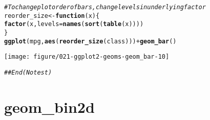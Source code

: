 \documentclass[a4paper,titlepage]{tufte-handout}\usepackage[]{graphicx}\usepackage[]{color}
\makeatletter
\def\maxwidth{ %
  \ifdim\Gin@nat@width>\linewidth
    \linewidth
  \else
    \Gin@nat@width
  \fi
}
\newcommand{\hlcom}[1]{\textcolor[rgb]{0.678,0.584,0.686}{\textit{#1}}}%
\newcommand{\hlopt}[1]{\textcolor[rgb]{0,0,0}{#1}}%
\newcommand{\hlstd}[1]{\textcolor[rgb]{0.345,0.345,0.345}{#1}}%
\newcommand{\hlkwa}[1]{\textcolor[rgb]{0.161,0.373,0.58}{\textbf{#1}}}%
\newcommand{\hlkwb}[1]{\textcolor[rgb]{0.69,0.353,0.396}{#1}}%
\newcommand{\hlkwc}[1]{\textcolor[rgb]{0.333,0.667,0.333}{#1}}%
\newcommand{\hlkwd}[1]{\textcolor[rgb]{0.737,0.353,0.396}{\textbf{#1}}}%
\newenvironment{kframe}{%
 \def\at@end@of@kframe{}%
 \ifinner\ifhmode%
  \def\at@end@of@kframe{\end{minipage}}%
  \begin{minipage}{\columnwidth}%
 \fi\fi%
 \def\FrameCommand##1{\hskip\@totalleftmargin \hskip-\fboxsep
 \colorbox{shadecolor}{##1}\hskip-\fboxsep
     \hskip-\linewidth \hskip-\@totalleftmargin \hskip\columnwidth}%
 \MakeFramed {\advance\hsize-\width
   \@totalleftmargin\z@ \linewidth\hsize
   \@setminipage}}%
 {\par\unskip\endMakeFramed%
 \at@end@of@kframe}
\newenvironment{knitrout}{}{} %
\makeatother
\begin{document}
\begin{knitrout}
\begin{kframe}
\begin{alltt}
\hlcom{# To change plot order of bars, change levels in underlying factor}
\hlstd{reorder_size} \hlkwb{<-} \hlkwa{function}\hlstd{(}\hlkwc{x}\hlstd{) \{}
  \hlkwd{factor}\hlstd{(x,} \hlkwc{levels} \hlstd{=} \hlkwd{names}\hlstd{(}\hlkwd{sort}\hlstd{(}\hlkwd{table}\hlstd{(x))))}
\hlstd{\}}
\hlkwd{ggplot}\hlstd{(mpg,} \hlkwd{aes}\hlstd{(}\hlkwd{reorder_size}\hlstd{(class)))} \hlopt{+} \hlkwd{geom_bar}\hlstd{()}
\end{alltt}
\end{kframe}
\texttt{[image: figure/021-ggplot2-geoms-geom\_bar-10]} 
\begin{kframe}\begin{alltt}
\hlcom{## End(No test)}
\end{alltt}
\end{kframe}
\end{knitrout}


\section{geom\_bin2d}
\end{document}
